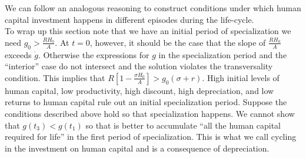 \noindent We can follow an analogous reasoning to construct conditions under which human capital investment happens in different episodes during the life-cycle.\\
\indent To wrap up this section note that we have an initial period of specialization we need $g_{0} > \frac{R H_{0}}{A}$. At $t=0$, however, it should be the case that the slope of $\frac{R H_{0}}{A}$ exceeds $\dot{g}$. Otherwise the expressions for $g$ in the specialization period and the ``interior'' case do not intersect and the solution violates the transversality condition. This implies that $R \left[ 1 - \frac{\sigma H_{0}}{A} \right] > g_{0}(\sigma + r)$. High initial levels of human capital, low productivity, high discount, high depreciation, and low returns to human capital rule out an initial specialization period. Suppose the conditions described above hold so that specialization happens. We cannot show that $g(t_{3}) < g(t_{1})$ so that is better to accumulate ``all the human capital required for life'' in the first period of specialization. This is what we call cycling in the investment on human capital and is a consequence of depreciation.










